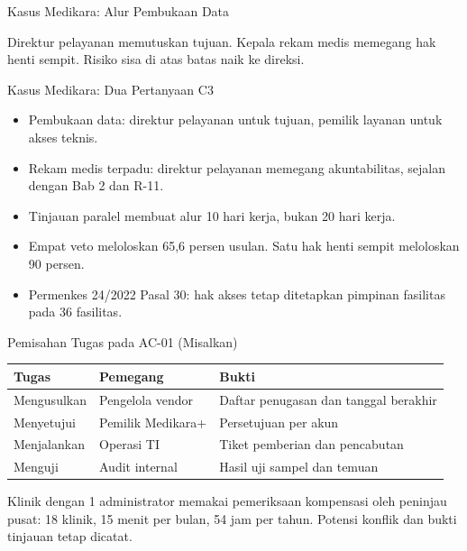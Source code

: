 \documentclass[aspectratio=169, table, 12pt]{beamer}
\begin{document}
\begin{frame}{{\Large Kasus Medikara: Alur Pembukaan Data}}
  \vspace{4pt}
  \begin{center}
    \resizebox{0.92\textwidth}{!}{}
  \end{center}
  \small Direktur pelayanan memutuskan tujuan. Kepala rekam medis memegang hak henti sempit. Risiko
  sisa di atas batas naik ke direksi.
\end{frame}

\begin{frame}{{\Large Kasus Medikara: Dua Pertanyaan C3}}
  \vspace{6pt}
  \small
  \begin{itemize}
    \item Pembukaan data: direktur pelayanan untuk tujuan, pemilik layanan untuk akses teknis.
    \item Rekam medis terpadu: direktur pelayanan memegang akuntabilitas, sejalan dengan Bab 2 dan
          R-11.
    \item Tinjauan paralel membuat alur 10 hari kerja, bukan 20 hari kerja.
    \item Empat veto meloloskan 65,6 persen usulan. Satu hak henti sempit meloloskan 90 persen.
    \item Permenkes 24/2022 Pasal 30: hak akses tetap ditetapkan pimpinan fasilitas pada 36
          fasilitas.
  \end{itemize}
\end{frame}

\begin{frame}{{\Large Pemisahan Tugas pada AC-01 (Misalkan)}}
  \vspace{4pt}
  \footnotesize
  \begin{tabularx}{\textwidth}{|>{\raggedright\arraybackslash}p{}|>{\raggedright\arraybackslash}p{}|>{\raggedright\arraybackslash}X|}
    \hline
    \textbf{Tugas} & \textbf{Pemegang} & \textbf{Bukti} \\ \hline
    Mengusulkan & Pengelola vendor & Daftar penugasan dan tanggal berakhir \\ \hline
    Menyetujui & Pemilik Medikara+ & Persetujuan per akun \\ \hline
    Menjalankan & Operasi TI & Tiket pemberian dan pencabutan \\ \hline
    Menguji & Audit internal & Hasil uji sampel dan temuan \\ \hline
  \end{tabularx}

  \vspace{8pt}
  \small Klinik dengan 1 administrator memakai pemeriksaan kompensasi oleh peninjau pusat: 18
  klinik, 15 menit per bulan, 54 jam per tahun. Potensi konflik dan bukti tinjauan tetap dicatat.
\end{frame}
\end{document}
